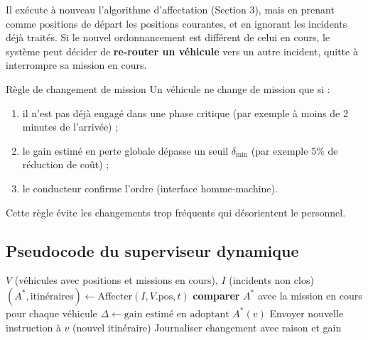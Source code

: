 \documentclass[12pt,a4paper]{article}
\theoremstyle{definition}
\theoremstyle{remark}
\begin{document}
Il exécute à nouveau l’algorithme d’affectation (Section 3), mais en
prenant comme positions de départ les positions courantes, et en
ignorant les incidents déjà traités. Si le nouvel ordonnancement est
différent de celui en cours, le système peut décider de \textbf{re‑router
un véhicule} vers un autre incident, quitte à interrompre sa mission
en cours.

\begin{defbox}{Règle de changement de mission}
Un véhicule ne change de mission que si :
\begin{enumerate}[leftmargin=1.5em]
  \item il n’est pas déjà engagé dans une phase critique (par exemple
        à moins de 2 minutes de l’arrivée) ;
  \item le gain estimé en perte globale dépasse un seuil $\delta_{\min}$
        (par exemple $5\%$ de réduction de coût) ;
  \item le conducteur confirme l’ordre (interface homme‑machine).
\end{enumerate}
Cette règle évite les changements trop fréquents qui désorientent
le personnel.
\end{defbox}

\subsection{Pseudocode du superviseur dynamique}

\begin{algorithm}[H]
\caption{Superviseur d’allocation dynamique (exécuté périodiquement)}
\begin{algorithmic}[1]
\Require $V$ (véhicules avec positions et missions en cours),
         $I$ (incidents non clos)
\State $(A^*, \text{itinéraires}) \gets \text{Affecter}(I, V.\text{pos}, t)$
\State \textbf{comparer} $A^*$ avec la mission en cours pour chaque véhicule
        \State $\Delta \gets \text{gain estimé en adoptant } A^*(v)$
            \State Envoyer nouvelle instruction à $v$ (nouvel itinéraire)
            \State Journaliser changement avec raison et gain
        \EndIf
    \EndIf
\EndFor
\end{algorithmic}
\end{algorithm}

\newpage

\end{document}
